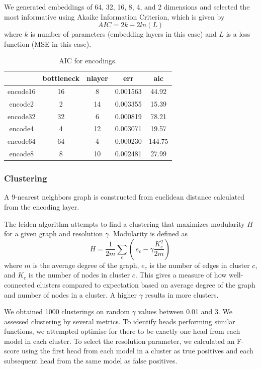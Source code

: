 \documentclass{article}
\begin{document}
We generated embeddings of 64, 32, 16, 8, 4, and 2 dimensions and selected the most informative using Akaike Information Criterion, which is given by $$ AIC = 2k - 2ln(L)$$ where $k$ is number of parameters (embedding layers in this case) and $L$ is a loss function (MSE in this case).

\begin{center}
\begin{table}
\begin{tabular}{c|c|c|c|c}
	& bottleneck & nlayer & err & aic \\
	\hline
	encode16 & 16 & 8 & 0.001563 & 44.92 \\
	encode2 & 2 & 14 & 0.003355 & 15.39 \\
	encode32 & 32 & 6 & 0.000819 & 78.21 \\
	encode4 & 4 & 12 & 0.003071 & 19.57 \\
	encode64 & 64 & 4 & 0.000230 & 144.75 \\
	encode8 & 8 & 10 & 0.002481 & 27.99 \\
\end{tabular}
\caption{AIC for encodings.}
\end{table}
\end{center}

	\subsubsection{Clustering}
			A 9-nearest neighbors graph is constructed from euclidean distance calculated from the encoding layer.


			The leiden algorithm attempts to find a clustering that maximizes modularity $ H $ for a given graph and resolution $ \gamma $.  Modularity is defined as $$ H = \frac{1}{2m}\sum_{c}( \,e_c - \gamma\frac{K_c^2}{2m}) \, $$ where $m$ is the average degree of the graph, $e_c$ is the number of edges in cluster $c$, and $K_c$ is the number of nodes in cluster $c$. This gives a measure of how well-connected clusters compared to expectation based on average degree of the graph and number of nodes in a cluster. A higher $\gamma$ results in more clusters.

			We obtained 1000 clusterings on random $\gamma$ values between 0.01 and 3. We assessed clustering by several metrics. To identify heads performing similar functions, we attempted optimise for there to be exactly one head from each model in each cluster. To select the resolution parameter, we calculated an F-score using the first head from each model in a cluster as true positives and each subsequent head from the same model as false positives.
\end{document}
